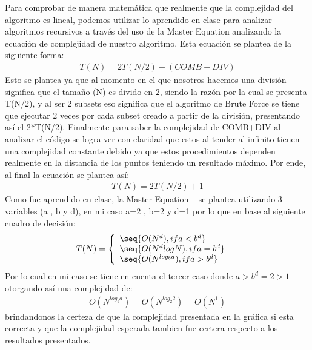 Para comprobar de manera matemática que realmente que la complejidad del algoritmo es lineal, podemos utilizar lo aprendido en clase para analizar algoritmos recursivos a través del uso de la Master Equation analizando la ecuación de complejidad de nuestro algoritmo. Esta ecuación se plantea de la siguiente forma:
\begin{align*}
    T(N) = 2T(N/2) + (COMB+DIV)
\end{align*}
Esto se plantea ya que al momento en el que nosotros hacemos una división significa que el tamaño (N) es divido en 2, siendo la razón por la cual se presenta T(N/2), y al ser 2 subsets eso significa que el algoritmo de Brute Force se tiene que ejecutar 2 veces por cada subset creado a partir de la división, presentando así el 2*T(N/2). Finalmente para saber la complejidad de COMB+DIV al analizar el código se logra ver con claridad que estos al tender al infinito tienen una complejidad constante debido ya que estos procedimientos dependen realmente en la distancia de los puntos teniendo un resultado máximo. Por ende, al final la ecuación se plantea así:
\begin{align*}
    T(N) = 2T(N/2) + 1
\end{align*}
Como fue aprendido en clase, la Master Equation ~\cite{McConnell2008} se plantea utilizando 3 variables (a , b y d), en mi caso a=2 , b=2 y d=1 por lo que en base al siguiente cuadro de decisión:
\begin{align*}
T(N) &= \left\{ \begin{array}{l}
             \seq{O(N^d), if a<b^d} \\
             \seq{O(N^dlogN), if a=b^d} \\
             \seq{O(N^{log_b a}), if a>b^d}
         \end{array}\right.    
\end{align*}
Por lo cual en mi caso se tiene en cuenta el tercer caso donde $a>b^d=2>1$ otorgando así una complejidad de: \\
\begin{align*}
    O(N^{log_b a})=O(N^{log_2 2})=O(N^1)   
\end{align*}
brindandonos la certeza de que la complejidad presentada en la gráfica si esta correcta y que la complejidad esperada tambien fue certera respecto a los resultados presentados.

